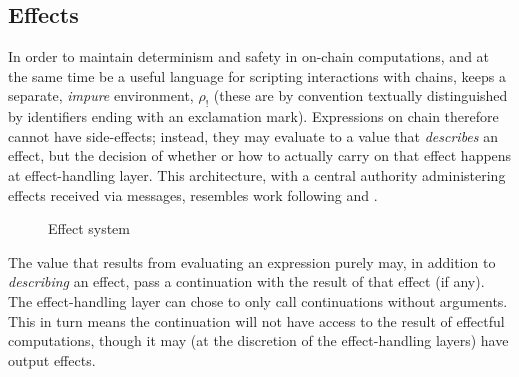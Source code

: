 \subsection{Effects} In order to maintain determinism and safety in on-chain
computations, and at the same time be a useful language for scripting
interactions with chains, \rad keeps a separate, \textit{impure} environment,
$\rho_{!}$ (these are by convention textually distinguished by identifiers
ending with an exclamation mark). Expressions on chain therefore cannot have
side-effects; instead, they may evaluate to a value that \textit{describes} an effect,
but the decision of whether or how to actually carry on that effect happens at
effect-handling layer. This architecture, with a central authority
administering effects received via messages, resembles work following
\cite{Cartwright1994} and \cite{Bauer2003}.


\begin{figure}[H]
\caption{Effect system}
\label{f:effects}
\end{figure}

The value that results from evaluating an expression purely may, in addition to
\textit{describing} an effect, pass a continuation with the result of that
effect (if any). The effect-handling layer can chose to only call continuations
without arguments. This in turn means the continuation will not have access to
the result of effectful computations, though it may (at the discretion of the
effect-handling layers) have output effects.

